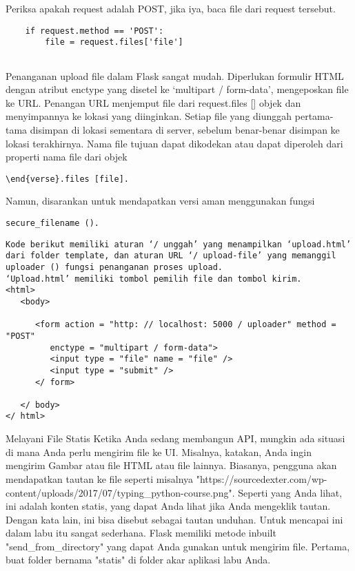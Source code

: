 \documentclass[12pt,a4paper]{article}
\begin{document}
Periksa apakah request adalah POST, jika iya, baca file dari request tersebut.
\begin{verbatim}    
	if request.method == 'POST':
        file = request.files['file']
        
\end{verbatim}
Penanganan upload file dalam Flask sangat mudah. Diperlukan formulir HTML dengan atribut enctype yang disetel ke ‘multipart / form-data’, mengeposkan file ke URL. Penangan URL menjemput file dari request.files [] objek dan menyimpannya ke lokasi yang diinginkan. Setiap file yang diunggah pertama-tama disimpan di lokasi sementara di server, sebelum benar-benar disimpan ke lokasi terakhirnya. Nama file tujuan dapat dikodekan atau dapat diperoleh dari properti nama file dari objek 
\begin{verbatim}
\end{verse}.files [file]. 
\end{verbatim}
Namun, disarankan untuk mendapatkan versi aman menggunakan fungsi 
\begin{verbatim}
secure_filename ().
\end{verbatim}
\begin{verbatim}
Kode berikut memiliki aturan ‘/ unggah’ yang menampilkan ‘upload.html’ dari folder template, dan aturan URL ‘/ upload-file’ yang memanggil uploader () fungsi penanganan proses upload.
‘Upload.html’ memiliki tombol pemilih file dan tombol kirim.
<html>
   <body>
   
      <form action = "http: // localhost: 5000 / uploader" method = "POST"
         enctype = "multipart / form-data">
         <input type = "file" name = "file" />
         <input type = "submit" />
      </ form>
      
   </ body>
</ html>
\end{verbatim}
Melayani File Statis
Ketika Anda sedang membangun API, mungkin ada situasi di mana Anda perlu mengirim file ke UI. Misalnya, katakan, Anda ingin mengirim Gambar atau file HTML atau file lainnya. Biasanya, pengguna akan mendapatkan tautan ke file seperti misalnya "https://sourcedexter.com/wp-content/uploads/2017/07/typing\_python-course.png". Seperti yang Anda lihat, ini adalah konten statis, yang dapat Anda lihat jika Anda mengeklik tautan. Dengan kata lain, ini bisa disebut sebagai tautan unduhan.
Untuk mencapai ini dalam labu itu sangat sederhana. Flask memiliki metode inbuilt "send\_from\_directory" yang dapat Anda gunakan untuk mengirim file. Pertama, buat folder bernama "statis" di folder akar aplikasi labu Anda.
\end{document}
